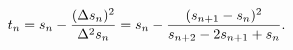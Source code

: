 \[t_{n}=s_{n}-\frac{(\Delta s_{n})^{2}}{\Delta^{2}s_{n}}=s_{n}-\frac{(s_{n+1}-s_%
{n})^{2}}{s_{n+2}-2s_{n+1}+s_{n}}.\]
